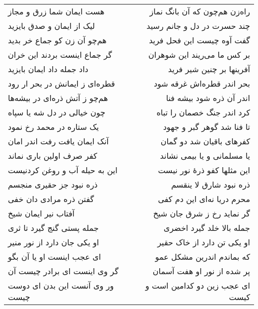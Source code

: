 \begin{center}
\begin{longtable}{l p{0.5cm} r}
\\
هست ایمان شما زرق و مجاز
&&
راه‌زن هم‌چون که آن بانگ نماز
\\
لیک از ایمان و صدق بایزید
&&
چند حسرت در دل و جانم رسید
\\
هم‌چو آن زن کو جماع خر بدید
&&
گفت آوه چیست این فحل فرید
\\
گر جماع اینست بردند این خران
&&
بر کس ما می‌ریند این شوهران
\\
داد جمله داد ایمان بایزید
&&
آفرینها بر چنین شیر فرید
\\
قطره‌ای ز ایمانش در بحر ار رود
&&
بحر اندر قطره‌اش غرقه شود
\\
هم‌چو ز آتش ذره‌ای در بیشه‌ها
&&
اندر آن ذره شود بیشه فنا
\\
چون خیالی در دل شه یا سپاه
&&
کرد اندر جنگ خصمان را تباه
\\
یک ستاره در محمد رخ نمود
&&
تا فنا شد گوهر گبر و جهود
\\
آنک ایمان یافت رفت اندر امان
&&
کفرهای باقیان شد دو گمان
\\
کفر صرف اولین باری نماند
&&
یا مسلمانی و یا بیمی نشاند
\\
این به حیله آب و روغن کردنیست
&&
این مثلها کفو ذرهٔ نور نیست
\\
ذره نبود جز حقیری منجسم
&&
ذره نبود شارق لا ینقسم
\\
گفتن ذره مرادی دان خفی
&&
محرم دریا نه‌ای این دم کفی
\\
آفتاب نیر ایمان شیخ
&&
گر نماید رخ ز شرق جان شیخ
\\
جمله پستی گنج گیرد تا ثری
&&
جمله بالا خلد گیرد اخضری
\\
او یکی جان دارد از نور منیر
&&
او یکی تن دارد از خاک حقیر
\\
ای عجب اینست او یا آن بگو
&&
که بماندم اندرین مشکل عمو
\\
گر وی اینست ای برادر چیست آن
&&
پر شده از نور او هفت آسمان
\\
ور وی آنست این بدن ای دوست چیست
&&
ای عجب زین دو کدامین است و کیست
\\
\end{longtable}
\end{center}
